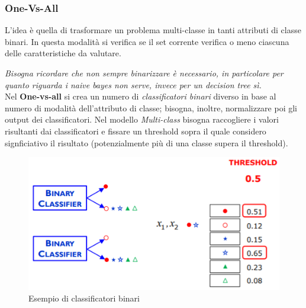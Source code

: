 \subsubsection{One-Vs-All}
L'idea è quella di trasformare un problema multi-classe in tanti attributi di classe binari. 
In questa modalità si verifica se il set corrente verifica o meno ciascuna delle caratteristiche da valutare. 

\textit{Bisogna ricordare che non sempre binarizzare è necessario, in particolare per quanto riguarda i naive bayes non serve, invece per un decision tree sì.} 
\\Nel \textbf{One-vs-all} si crea un numero di \textit{classificatori binari} diverso in base al numero di modalità dell'attributo di classe; bisogna, inoltre, normalizzare poi gli output dei classificatori. 
Nel modello \textit{Multi-class} bisogna raccogliere i valori risultanti dai classificatori e fissare un threshold sopra il quale considero signficiativo il risultato (potenzialmente pi\`u di una classe supera il threshold).
\begin{figure}[H]
	\centering
	\includegraphics[height=0.4 \linewidth]{classification/pict/es_no_binary_classification.png}
	\caption{Esempio di classificatori binari}
\end{figure} 

